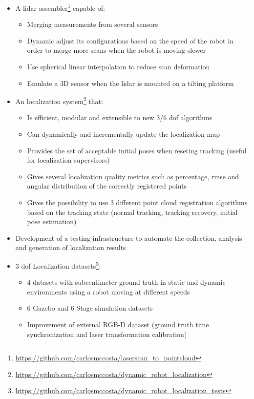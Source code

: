 \begin{itemize}
	\item A \gls{lidar} assembler\footnote{\url{https://github.com/carlosmccosta/laserscan_to_pointcloud}} capable of:
	\begin{itemize}
		\item Merging measurements from several sensors
		\item Dynamic adjust its configurations based on the speed of the robot in order to merge more scans when the robot is moving slower
		\item Use spherical linear interpolation to reduce scan deformation
		\item Emulate a 3D sensor when the \gls{lidar} is mounted on a tilting platform
	\end{itemize}

	\item An localization system\footnote{\url{https://github.com/carlosmccosta/dynamic_robot_localization}} that:
	\begin{itemize}
		\item Is efficient, modular and extensible to new 3/6 \gls{dof} algorithms
		\item Can dynamically and incrementally update the localization map
		\item Provides the set of acceptable initial poses when reseting tracking (useful for localization supervisors)
		\item Gives several localization quality metrics such as percentage, \gls{rmse} and angular distribution of the correctly registered points
		\item Gives the possibility to use 3 different point cloud registration algorithms based on the tracking state (normal tracking, tracking recovery, initial pose estimation)
	\end{itemize}

	\item Development of a testing infrastructure to automate the collection, analysis and generation of localization results

	\item 3 \gls{dof} Localization datasets\footnote{\url{https://github.com/carlosmccosta/dynamic_robot_localization_tests}}:
	\begin{itemize}
		\item 4 datasets with subcentimeter ground truth in static and dynamic environments using a robot moving at different speeds
		\item 6 Gazebo and 6 Stage simulation datasets
		\item Improvement of external RGB-D dataset (ground truth time synchronization and laser transformation calibration)
	\end{itemize}


\end{itemize}
